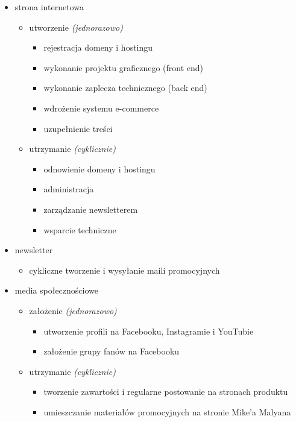 \documentclass[12pt]{article}
\begin{document}
\begin{itemize}
    \item strona internetowa \begin{itemize}
        \item utworzenie \textit{(jednorazowo)} \begin{itemize}
            \item rejestracja domeny i hostingu
            \item wykonanie projektu graficznego (front end)
            \item wykonanie zaplecza technicznego (back end)
            \item wdrożenie systemu e-commerce
            \item uzupełnienie treści \end{itemize}
        \item utrzymanie \textit{(cyklicznie)} \begin{itemize}
            \item odnowienie domeny i hostingu
            \item administracja
            \item zarządzanie newsletterem
            \item wsparcie techniczne \end{itemize} \end{itemize}
    \item newsletter \begin{itemize}
        \item cykliczne tworzenie i wysyłanie maili promocyjnych \end{itemize}
    \item media społecznościowe \begin{itemize}
        \item założenie \textit{(jednorazowo)} \begin{itemize}
            \item utworzenie profili na Facebooku, Instagramie i YouTubie
            \item założenie grupy fanów na Facebooku \end{itemize}
        \item utrzymanie \textit{(cyklicznie)} \begin{itemize}
            \item tworzenie zawartości i regularne postowanie na stronach produktu
            \item umieszczanie materiałów promocyjnych na stronie Mike'a Malyana

\end{itemize}
\end{itemize}
\end{itemize}
\end{document}
